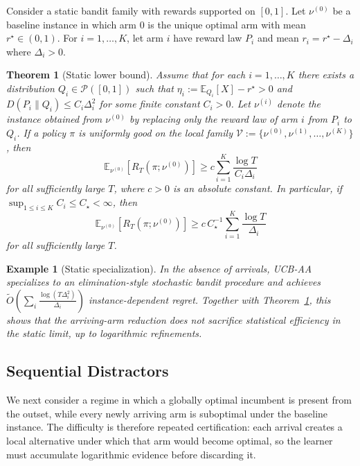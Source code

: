 \documentclass[11pt]{article}
\newtheorem{theorem}{Theorem}
\newtheorem{example}{Example}
\begin{document}
Consider a static bandit family with rewards supported on $[0,1]$. Let $\nu^{(0)}$ be a baseline
instance in which arm $0$ is the unique optimal arm with mean $r^\star\in(0,1)$. For
$i=1,\dots,K$, let arm $i$ have reward law $P_i$ and mean
\(
r_i=r^\star-\Delta_i\) where \(
\Delta_i>0.
\)

\begin{theorem}[Static lower bound]
\label{thm:static-lb-local-quadratic}
Assume that for each $i=1,\dots,K$ there exists a distribution $Q_i\in\mathcal P([0,1])$ such
that
\(
\eta_i:=\mathbb E_{Q_i}[X]-r^\star>0\) and
\(
D(P_i\|Q_i)\le C_i\Delta_i^2
\)
for some finite constant $C_i>0$. Let $\nu^{(i)}$ denote the instance obtained from $\nu^{(0)}$
by replacing only the reward law of arm $i$ from $P_i$ to $Q_i$. If a policy $\pi$ is uniformly
good on the local family $\mathcal V:=\{\nu^{(0)},\nu^{(1)},\dots,\nu^{(K)}\}$, then
\[
\mathbb E_{\nu^{(0)}}[R_T(\pi;\nu^{(0)})]
\ge
c\sum_{i=1}^K \frac{\log T}{C_i\Delta_i}
\]
for all sufficiently large $T$, where $c>0$ is an absolute constant. In particular, if $\sup_{1\le i\le K} C_i\le C_\star<\infty$, then
\[
\mathbb E_{\nu^{(0)}}[R_T(\pi;\nu^{(0)})]
\ge
c\,C_\star^{-1}\sum_{i=1}^K \frac{\log T}{\Delta_i}
\]
for all sufficiently large $T$.
\end{theorem}



\begin{example}[Static specialization]
\label{exp:static}
In the absence of arrivals, UCB-AA specializes to an elimination-style stochastic bandit
procedure and achieves
\(
\tilde O\left(\sum_i \frac{\log(T\Delta_i^2)}{\Delta_i}\right)
\)
instance-dependent regret. Together with
Theorem~\ref{thm:static-lb-local-quadratic}, this shows that the arriving-arm reduction does
not sacrifice statistical efficiency in the static limit, up to logarithmic refinements.
\end{example}

\subsection{Sequential Distractors}

We next consider a regime in which a globally optimal incumbent is present from the outset,
while every newly arriving arm is suboptimal under the baseline instance. The difficulty is
therefore repeated certification: each arrival creates a local alternative under which that arm
would become optimal, so the learner must accumulate logarithmic evidence before discarding it.
\end{document}
